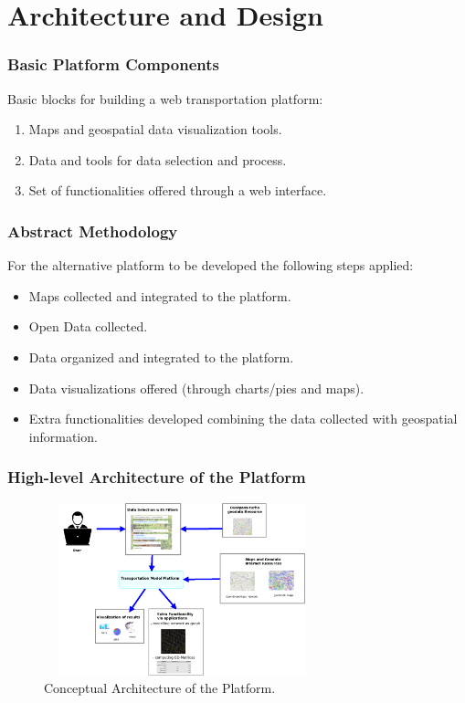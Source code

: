 \documentclass{beamer}
\begin{document}
\section{Architecture and Design}
    \begin{frame}
    \frametitle{Basic Platform Components}
    Basic blocks for building a web transportation platform:
    \begin{enumerate}
        \item Maps and geospatial data visualization tools.
        \item Data and tools for data selection and process.
        \item Set of functionalities offered through a web interface.
    \end{enumerate}
    
	\end{frame}
	
	\begin{frame}
    \frametitle{Abstract Methodology}
    For the alternative platform to be developed the following steps applied:
    
    \begin{itemize}
        \item Maps collected and integrated to the platform.
        \item Open Data collected.
        \item Data organized and integrated to the platform.
        \item Data visualizations offered (through charts/pies and maps).
        \item Extra functionalities developed combining the data collected with geospatial information.
    \end{itemize}
    
    \end{frame}
    
    \begin{frame}
    \frametitle{High-level Architecture of the Platform}
    \begin{figure}[h]
    \centering
    \includegraphics[width=8cm, height=5cm]{10_conceptual-architecture}
    \caption{Conceptual Architecture of the Platform.}
    \label{fig:arch}
    \end{figure}
    \end{frame}
    
\end{document}
